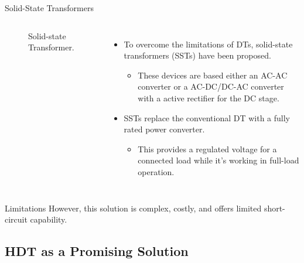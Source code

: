 \begin{frame}{Solid-State Transformers}
    \begin{columns}
            \begin{figure}
                \centering
                \resizebox{!}{1.7cm}{}
                \caption{Solid-state Transformer.}
                \label{fig:SST}
            \end{figure}
            \begin{itemize}
            \item To overcome the limitations of DTs, solid-state transformers (SSTs) have been proposed.
            \begin{itemize}
                \item These devices are based either an AC-AC converter or a AC-DC/DC-AC converter with a active rectifier for the DC stage.
            \end{itemize}
            \item SSTs replace the conventional DT with a fully rated power converter.
            \begin{itemize}
                \item This provides a regulated voltage for a connected load while it's working in full-load operation.
            \end{itemize}
        \end{itemize}
    \end{columns}
    \pause
    \begin{alertblock}{Limitations}
        However, this solution is complex, costly, and offers limited short-circuit capability.
    \end{alertblock}
\end{frame}

\subsection{HDT as a Promising Solution}

